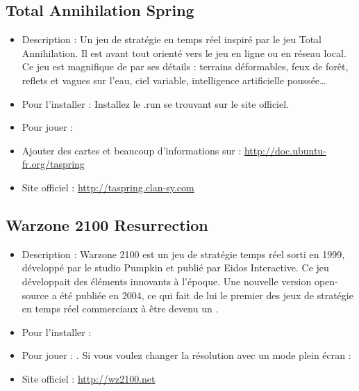 \subsection{Total Annihilation Spring}
\begin{itemize}
\begingroup
{}
\item Description : Un jeu de stratégie en temps réel inspiré par le jeu Total Annihilation. Il est avant tout orienté vers le jeu en ligne ou en réseau local. Ce jeu est magnifique de par ses détails : terrains déformables, feux de forêt, reflets et vagues sur l'eau, ciel variable, intelligence artificielle poussée\ldots{}{\par}
\endgroup
\item Pour l'installer : Installez le .run se trouvant sur le site officiel.{\par}
\item Pour jouer : 
\item Ajouter des cartes et beaucoup d'informations sur : \url{http://doc.ubuntu-fr.org/taspring}{\par}
\item Site officiel : \url{http://taspring.clan-sy.com}{\par}
\end{itemize}
\subsection{Warzone 2100 Resurrection}
\begin{itemize}
\begingroup
{}
\item Description : Warzone 2100 est un jeu de stratégie temps réel sorti en 1999, développé par le studio Pumpkin et publié par Eidos Interactive. Ce jeu développait des éléments innovants à l'époque.  Une nouvelle version open-source a été publiée en 2004, ce qui fait de lui le premier des jeux de stratégie en temps réel commerciaux à être devenu un .{\par}
\endgroup
\item Pour l'installer : 
\item Pour jouer : . Si vous voulez changer la résolution avec un mode plein écran : 
\item Site officiel : \url{http://wz2100.net}{\par}
\end{itemize}
